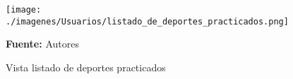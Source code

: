 \begin{figure}[!htb]
  \begin{center}
\texttt{[image: ./imagenes/Usuarios/listado\_de\_deportes\_practicados.png]}
    \caption{Vista listado de deportes practicados}
    \label{fig:Vista_listado_de_deportes_practicados}
    \textbf{Fuente:}  Autores
  \end{center}
\end{figure}
